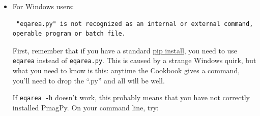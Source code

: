 \documentclass[11pt]{book}
\begin{document}
{{\begin{enumerate}
\begin{itemize}
\begin{verbatim}
\end{verbatim}

for more information.

If for some reason you need to add PmagPy to your \$PATH manually, you can find more general information about setting \$PATH \href{https://stackoverflow.com/questions/14637979/how-to-permanently-set-path-on-linux-unix}{here}, and specific information about adding {\bf PmagPy} to your \$PATH \href{#setting_path}{here}.







\item For Windows users:

\begin{verbatim} "eqarea.py" is not recognized as an internal or external command,
operable program or batch file.
\end{verbatim}

First, remember that if you have a standard \href{#pip_install}{pip install}, you need to use \texttt{eqarea} instead of \texttt{eqarea.py}. This is caused by a strange Windows quirk, but what you need to know is this: anytime the Cookbook gives a command, you'll need to drop the ``.py'' and all will be well.

If \texttt{eqarea -h} doesn't work, this probably means that you have not correctly installed PmagPy.  On your command line, try:


\end{itemize}
\end{enumerate}}}
\end{document}
